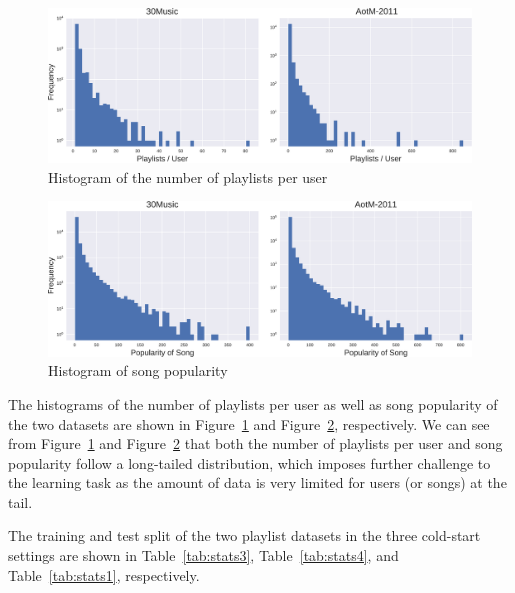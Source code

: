 %

\begin{figure}[!h]
    \centering
    \includegraphics[width=.98\columnwidth]{fig/hist_pluser.pdf}
    \caption{Histogram of the number of playlists per user}
    \label{fig:hist_pluser}
\end{figure}

\begin{figure}[!h]
    \centering
    \includegraphics[width=.98\columnwidth]{fig/hist_songpop.pdf}
    \caption{Histogram of song popularity}
    \label{fig:hist_songpop}
\end{figure}

The histograms of the number of playlists per user as well as song popularity 
of the two datasets are shown in Figure~\ref{fig:hist_pluser} and Figure~\ref{fig:hist_songpop},
respectively.
We can see from Figure~\ref{fig:hist_pluser} and Figure~\ref{fig:hist_songpop} that both the number
of playlists per user and song popularity follow a long-tailed distribution, which imposes further challenge to the learning task 
as the amount of data is very limited for users (or songs) at the tail.

\newpage

The training and test split of the two playlist datasets in the three cold-start settings are shown in 
Table~\ref{tab:stats3}, Table~\ref{tab:stats4}, and Table~\ref{tab:stats1}, respectively.
%

